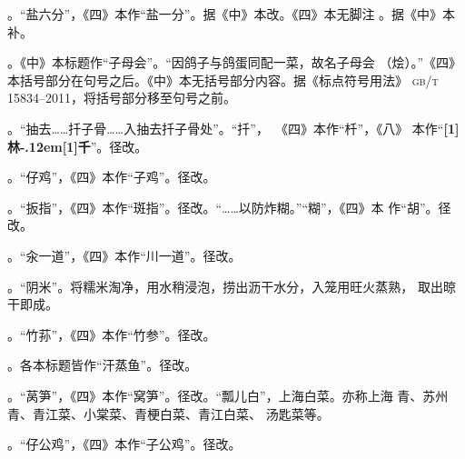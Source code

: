 。“盐六分”，《四》本作“盐一分”。据《中》本改。《四》本无脚注%
{\footnotesize{}}。据《中》本补。

。《中》本标题作“子母会”。“因鸽子与鸽蛋同配一菜，故名子母会
（烩）。”《四》本括号部分在句号之后。《中》本无括号部分内容。据《标点符号用法》
\textsc{gb/t 15834--2011}，将括号部分移至句号之前。

。“抽去……扦子骨……入抽去扦子骨处”。“扦”，~《四》本作“杄”，《八》
本作“{\bfseries\scalebox{.65}[1]{林}\kern-.12em\scalebox{.55}[1]{千}}”。径改。

。“仔鸡”，《四》本作“子鸡”。径改。

。“扳指”，《四》本作“斑指”。径改。“……以防炸糊。”“糊”，《四》本
作“胡”。径改。

。“汆一道”，《四》本作“川一道”。径改。

。“阴米”。将糯米淘净，用水稍浸泡，捞出沥干水分，入笼用旺火蒸熟，
取出晾干即成。

。“竹荪”，《四》本作“竹参”。径改。

。各本标题皆作“汗蒸鱼”。径改。

。“莴笋”，《四》本作“窝笋”。径改。“瓢儿白”，上海白菜。亦称上海
青、苏州青、青江菜、小棠菜、青梗白菜、青江白菜、 汤匙菜等。

。“仔公鸡”，《四》本作“子公鸡”。径改。

\endgroup%

